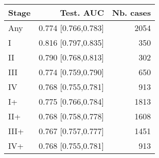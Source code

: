 \begin{table}[ht]
\centering
\begin{tabular}{lrr}
  \toprule
Stage & Test. AUC & Nb. cases \\ 
  \midrule
Any & 0.774 [0.766,0.783] & 2054 \\ 
   \addlinespace
I & 0.816 [0.797,0.835] & 350 \\ 
  II & 0.790 [0.768,0.813] & 302 \\ 
  III & 0.774 [0.759,0.790] & 650 \\ 
  IV & 0.768 [0.755,0.781] & 913 \\ 
   \addlinespace
I+ & 0.775 [0.766,0.784] & 1813 \\ 
  II+ & 0.768 [0.758,0.778] & 1608 \\ 
  III+ & 0.767 [0.757,0.777] & 1451 \\ 
  IV+ & 0.768 [0.755,0.781] & 913 \\ 
   \bottomrule
\end{tabular}
\end{table}
